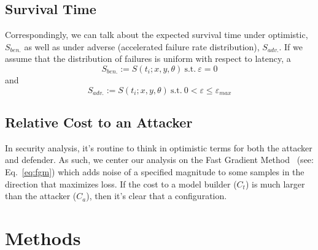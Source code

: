 \documentclass[conference]{IEEEtran}
\begin{document}
\subsection{Survival Time}
Correspondingly, we can talk about the expected survival time under optimistic, $S_{ben.}$ as well as under adverse (accelerated failure rate distribution), $S_{adv.}$. If we assume that the distribution of failures is uniform with respect to latency, a
$$
S_{ben.} := S(t_i; x, y, \theta) \mathrm{~s.t.~} \varepsilon = 0
$$
and
$$
S_{adv.} :=  S(t_i; x, y, \theta) \mathrm{~s.t.~} 0 < \varepsilon \leq \varepsilon_{max}
$$
\subsection{Relative Cost to an Attacker}
In security analysis, it's routine to think in optimistic terms for both the attacker and defender. As such, we center our analysis on the Fast Gradient Method~\cite{fgm} (see: Eq.~\ref{eq:fgm}) which adds noise of a specified magnitude to some samples in the direction that maximizes loss. If the cost to a model builder ($C_t$) is much larger than the attacker ($C_a$), then it's clear that a configuration. 



\section{Methods}
\end{document}
